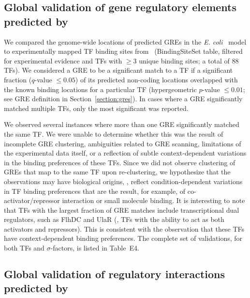 \subsection{Global validation of gene regulatory elements predicted by \egrine}
\label{section:tfbs:vs:regdb}

We compared the genome-wide locations of predicted GREs in the {\it
  E. coli} \egrine~model to experimentally mapped TF binding sites
from \rdb~(BindingSiteSet table, filtered for experimental evidence
and TFs with $\geq 3$ unique binding sites; a total of 88 TFs). We
considered a GRE to be a significant match to a TF if a significant
fraction ($q$-value $\leq 0.05$) of its predicted non-coding locations
overlapped with the known binding locations for a particular TF
(hypergeometric $p$-value $\leq 0.01$; see GRE definition in
Section~\ref{section:gres}). In cases where a GRE significantly
matched multiple TFs, only the most significant was reported.

We observed several instances where more than one GRE significantly
matched the same TF. We were unable to determine whether this was the
result of incomplete GRE clustering, ambiguities related to GRE
scanning, limitations of the experimental data itself, or a reflection
of subtle context-dependent variations in the binding preferences of
these TFs. Since we did not observe clustering of GREs that map to the
same TF upon re-clustering, we hypothesize that the observations may
have biological origins, \ie, reflect condition-dependent variations
in TF binding preferences that are the result, for example, of
co-activator/repressor interaction or small molecule binding. It is
interesting to note that TFs with the largest fraction of GRE matches
include transcriptional dual regulators, such as FlhDC and UlaR (\ie,
TFs with the ability to act as both activators and repressors). This
is consistent with the observation that these TFs have
context-dependent binding preferences. The complete set of
validations, for both TFs and $\sigma$-factors, is listed in Table~E4.

\subsection{Global validation of regulatory interactions predicted by \egrine}
\label{section:aupr:vs:regdb}

